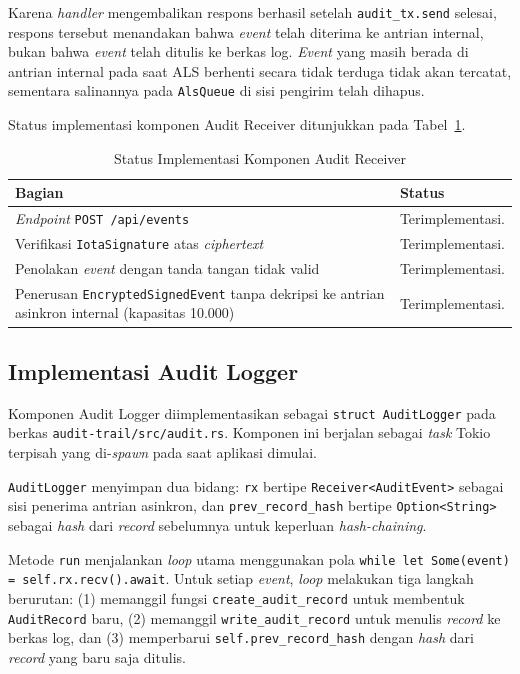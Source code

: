 Karena \textit{handler} mengembalikan respons berhasil setelah
\texttt{audit\_tx.send} selesai, respons tersebut menandakan bahwa
\textit{event} telah diterima ke antrian internal, bukan bahwa \textit{event}
telah ditulis ke berkas log. \textit{Event} yang masih berada di antrian
internal pada saat ALS berhenti secara tidak terduga tidak akan tercatat,
sementara salinannya pada \texttt{AlsQueue} di sisi pengirim telah dihapus.
 
Status implementasi komponen Audit Receiver ditunjukkan pada
Tabel~\ref{tab:status-implementasi-receiver}.
 
\begin{table}[htbp]
\centering
\caption{Status Implementasi Komponen Audit Receiver}
\label{tab:status-implementasi-receiver}
\renewcommand{\arraystretch}{1.3}
\begin{tabular}{|p{8cm}|p{3.5cm}|}
\hline
\textbf{Bagian} & \textbf{Status} \\
\hline
\textit{Endpoint} \texttt{POST /api/events} & Terimplementasi. \\
\hline
Verifikasi \texttt{IotaSignature} atas \textit{ciphertext} & Terimplementasi. \\
\hline
Penolakan \textit{event} dengan tanda tangan tidak valid & Terimplementasi. \\
\hline
Penerusan \texttt{EncryptedSignedEvent} tanpa dekripsi ke antrian asinkron internal (kapasitas 10.000) & Terimplementasi. \\
\hline
\end{tabular}
\end{table}


\subsection{Implementasi Audit Logger}

Komponen Audit Logger diimplementasikan sebagai \texttt{struct AuditLogger}
pada berkas \texttt{audit-trail/src/audit.rs}. Komponen ini berjalan sebagai
\textit{task} Tokio terpisah yang di-\textit{spawn} pada saat aplikasi dimulai.

\texttt{AuditLogger} menyimpan dua bidang: \texttt{rx} bertipe
\texttt{Receiver<AuditEvent>} sebagai sisi penerima antrian asinkron, dan
\texttt{prev\_record\_hash} bertipe \texttt{Option<String>} sebagai \textit{hash}
dari \textit{record} sebelumnya untuk keperluan \textit{hash-chaining}.

Metode \texttt{run} menjalankan \textit{loop} utama menggunakan pola
\texttt{while let Some(event) = self.rx.recv().await}. Untuk setiap \textit{event},
\textit{loop} melakukan tiga langkah berurutan: (1) memanggil fungsi
\texttt{create\_audit\_record} untuk membentuk \texttt{AuditRecord} baru,
(2) memanggil \texttt{write\_audit\_record} untuk menulis \textit{record} ke
berkas log, dan (3) memperbarui \texttt{self.prev\_record\_hash} dengan
\textit{hash} dari \textit{record} yang baru saja ditulis.

